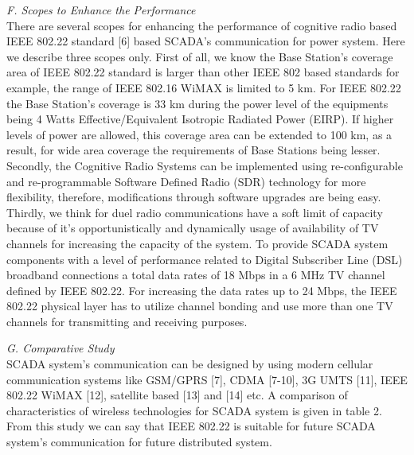 \documentclass[conference]{IEEEtran}
\begin{document}
\begin{Summary - }
\vspace{1cm}


\vspace{0.2cm}\emph{F. \hspace{0.3cm}Scopes to Enhance the Performance}\\
There are several scopes for enhancing the performance of
cognitive radio based IEEE 802.22 standard [6] based
SCADA’s communication for power system. Here we describe
three scopes only. First of all, we know the Base Station’s
coverage area of IEEE 802.22 standard is larger than other
IEEE 802 based standards for example, the range of IEEE
802.16 WiMAX is limited to 5 km. For IEEE 802.22 the Base
Station’s coverage is 33 km during the power level of the
equipments being 4 Watts Effective/Equivalent Isotropic
Radiated Power (EIRP). If higher levels of power are allowed,
this coverage area can be extended to 100 km, as a result, for
wide area coverage the requirements of Base Stations being
lesser. Secondly, the Cognitive Radio Systems can be
implemented using re-configurable and re-programmable
Software Defined Radio (SDR) technology for more flexibility,
therefore, modifications through software upgrades are being
easy. Thirdly, we think for duel radio communications have a
soft limit of capacity because of it’s opportunistically and
dynamically usage of availability of TV channels for increasing
the capacity of the system. To provide SCADA system
components with a level of performance related to Digital
Subscriber Line (DSL) broadband connections a total data rates
of 18 Mbps in a 6 MHz TV channel defined by IEEE 802.22.
For increasing the data rates up to 24 Mbps, the IEEE 802.22
physical layer has to utilize channel bonding and use more than
one TV channels for transmitting and receiving purposes.

\vspace{1cm}

\vspace{0.2cm}\emph{G. \hspace{0.3cm}Comparative Study}\\
SCADA system’s communication can be designed by using
modern cellular communication systems like GSM/GPRS [7],
CDMA [7-10], 3G UMTS [11], IEEE 802.22 WiMAX [12],
satellite based [13] and [14] etc. A comparison of
characteristics of wireless technologies for SCADA system is
given in table 2. From this study we can say that IEEE 802.22
is suitable for future SCADA system’s communication for
future distributed system.

\vspace{1cm}


\end{Summary - }
\end{document}
